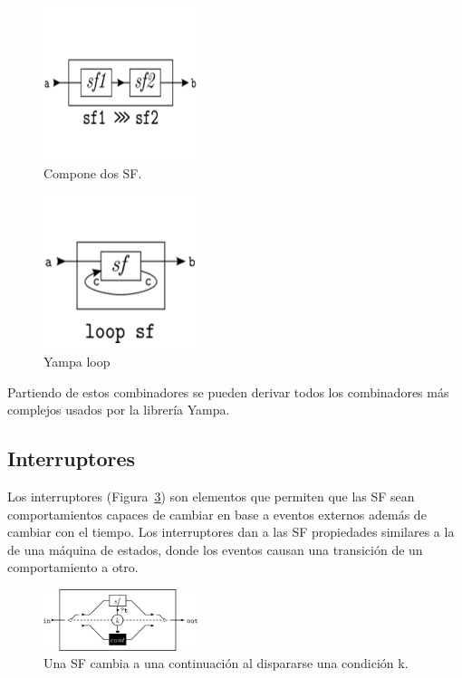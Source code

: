 \begin{figure}[htbp!]
\centering
\includegraphics[width=0.4\textwidth]{Yampa-composition}
\caption[Yampa-composition]{Compone dos SF.}
\label{fig:Yampa-composition}
\end{figure}

\begin{figure}[htbp!]
\centering
\includegraphics[width=0.4\textwidth]{Yampa-loop}
\caption[Yampa-loop]{Yampa loop}
\label{fig:Yampa-loop}
\end{figure}

Partiendo de estos combinadores se pueden derivar todos los combinadores más complejos usados por la librería Yampa.

\subsection{Interruptores}

Los interruptores (Figura~\ref{fig:Yampa-switch}) son elementos que permiten que las SF sean comportamientos capaces de cambiar en base a eventos externos además de cambiar con el tiempo. Los interruptores dan a las SF propiedades similares a la de una máquina de estados, donde los eventos causan una transición de un comportamiento a otro.

\begin{figure}[htbp!]
\centering
\includegraphics[width=0.4\textwidth]{Yampa-switch}
\caption[Yampa-switch]{Una SF cambia a una continuación al dispararse una condición k.}
\label{fig:Yampa-switch}
\end{figure}


